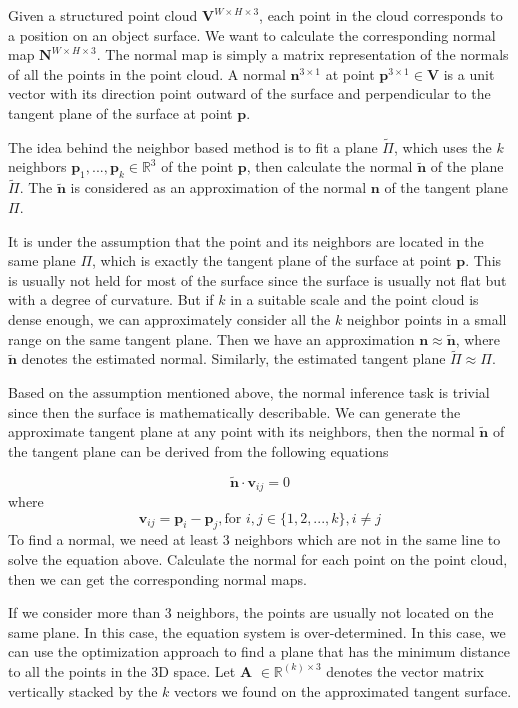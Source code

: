 Given a structured point cloud $ \textbf{V}^{W\times H\times 3} $, each point in the cloud corresponds to a position on an object surface. We want to calculate the corresponding normal map  $ \textbf{N}^{W\times H \times 3} $. The normal map is simply a matrix representation of the normals of all the points in the point cloud. A normal  $ \textbf{n}^{3\times 1} $ at point   $ \textbf{p}^{3\times 1} \in \textbf{V} $ is a unit vector with its direction point outward of the surface and perpendicular to the tangent plane of the surface at point $ \textbf{p} $.

The idea behind the neighbor based method is to fit a plane $ \tilde\Pi $, which uses the $ k $ neighbors $ \textbf{p}_1, ..., \textbf{p}_k \in \mathbb{R}^3 $ of the point $ \textbf{p} $, then calculate the normal $ \tilde{\textbf{n}} $ of the plane $ \tilde\Pi $. The $ \tilde{\textbf{n}} $ is considered as an approximation of the normal $ \textbf{n} $ of the tangent plane $ \Pi $.

It is under the assumption that the point and its neighbors are located in the same plane $ \Pi $, which is exactly the tangent plane of the surface at point $\textbf{p}  $. 
This is usually not held for most of the surface since the surface is usually not flat but with a degree of curvature. But if $ k $ in a suitable scale and the point cloud is dense enough, we can approximately consider all the $ k $ neighbor points in a small range on the same tangent plane. Then we have an approximation $ \textbf{n} \approx \tilde{\textbf{n}}$, where $ \tilde{\textbf{n}} $ denotes the estimated normal. Similarly, the estimated tangent plane $ \tilde{\Pi} \approx \Pi $. 

Based on the assumption mentioned above, the normal inference task is trivial since then the surface is mathematically describable. We can generate the approximate tangent plane at any point with its neighbors, then the normal $ \tilde{\textbf{n}} $ of the tangent plane can be derived from the following equations

\[\tilde{\textbf{n}} \cdot \textbf{v}_{ij}  = 0 \]
where 
\[ \textbf{v}_{ij} = \textbf{p}_i - \textbf{p}_j, \text{for } i, j \in \{ 1,2,...,k\}, i\neq j \]
To find a normal, we need at least 3 neighbors which are not in the same line to solve the equation above. Calculate the normal for each point on the point cloud, then we can get the corresponding normal maps. 

If we consider more than 3 neighbors, the points are usually not located on the same plane. In this case, the equation system is over-determined. In this case, we can use the optimization approach to find a plane that has the minimum distance to all the points in the 3D space. Let  $ \textbf{A }\in \mathbb{R}^{(k)\times 3} $  denotes the vector matrix vertically stacked by the $ k $ vectors we found on the approximated tangent surface.

